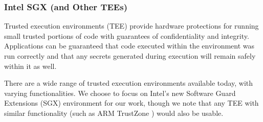 %
%
%
%
%

\subsubsection{Intel SGX (and Other TEEs)}
Trusted execution environments (TEE) provide hardware protections for running
small trusted portions of code with guarantees of confidentiality and
integrity.  Applications can be guaranteed that code executed within the
environment was run correctly and that any secrets generated during execution
will remain safely within it as well.

There are a wide range of trusted execution environments available today, with
varying functionalities.  We choose to focus on Intel's new Software Guard
Extensions (SGX) environment for our work, though we note that any TEE with
similar functionality (such as ARM TrustZone \cite{trustzone}) would also be
usable.


